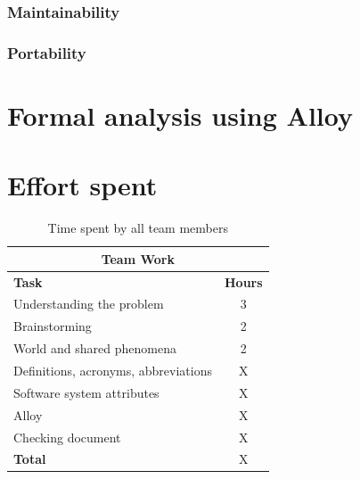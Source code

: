 \documentclass[12pt]{report}
\begin{document}
\subsection{Maintainability}
\subsection{Portability}

\chapter{Formal analysis using Alloy}

\chapter{Effort spent}
\begin{table}[h]
\centering 
\begin{tabular}{l c} 
\hline\hline 
\multicolumn{2}{c}{\textbf{Team Work}} \\ 
\hline
\textbf{Task} & \textbf{Hours} \\ [0.5ex] 
\hline 
Understanding the problem & 3  \\
Brainstorming & 2 \\
World and shared phenomena & 2 \\
Definitions, acronyms, abbreviations & X  \\
Software system attributes & X \\ 
Alloy & X \\
Checking document  & X  \\
\hline
\textbf{Total} & X  \\
\hline 
\end{tabular}
\caption{Time spent by all team members}
\label{fig:Time spent by all team members}
\end{table}
\end{document}
